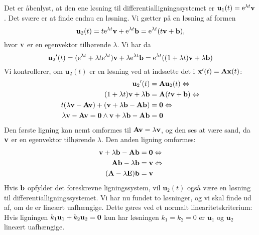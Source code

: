 \begin{bevis} \label{bev.diffsys.dobbeltrod1}
Det er åbenlyst, at den ene løsning til differentialligningssystemet er $ \mathbf u_1(t) = \mathrm{e}^{\lambda t} \mathbf{v} $. Det svære er at finde endnu en løsning. \bs
Vi gætter på en løsning af formen
\begin{equation}
\mathbf u_2(t) = t \mathrm{e}^{\lambda t} \mathbf{v} + \mathrm{e}^{\lambda t} \mathbf{b} = \mathrm{e}^{\lambda t}(t \mathbf{v} + \mathbf{b}),
\end{equation}
hvor $ \mathbf{v} $ er en egenvektor tilhørende $ \lambda $. Vi har da
\begin{equation}
\mathbf u_2\mathbf{'}(t) = (\mathrm{e}^{\lambda t} + \lambda t \mathrm{e}^{\lambda t})\mathbf{v} + \lambda \mathrm{e}^{\lambda t} \mathbf{b} = \mathrm{e}^{\lambda t}( (1 + \lambda t)\mathbf{v} + \lambda \mathbf{b})
\end{equation}
Vi kontrollerer, om $ \mathbf u_2(t) $ er en løsning ved at indsætte det i $ \mathbf{x}'(t) = \mathbf{A} \mathbf{x}(t) $:
\begin{equation}
\begin{aligned}
\mathbf u_2\mathbf{'}(t) &= \mathbf{A} \mathbf u_2(t) \Leftrightarrow \\
(1 + \lambda t)\mathbf{v} + \lambda \mathbf{b} &= \mathbf{A} (t \mathbf{v} + \mathbf{b}) \Leftrightarrow \\
t(\lambda \mathbf{v} - \mathbf{A} \mathbf{v} ) + (\mathbf{v} + \lambda \mathbf{b} - \mathbf{A} \mathbf{b}) &= \bm{0} \Leftrightarrow \\
\lambda \mathbf{v} - \mathbf{A} \mathbf{v} = \bm{0} \wedge \mathbf{v} + \lambda \mathbf{b} - \mathbf{A} \mathbf{b} &= \bm{0}
\end{aligned}
\end{equation}
Den første ligning kan nemt omformes til $ \mathbf{A} \mathbf{v} = \lambda \mathbf{v} $, og den ses at være sand, da $ \mathbf{v} $ er en egenvektor tilhørende $ \lambda $. Den anden ligning omformes:
\begin{equation}
\begin{aligned}
\mathbf{v} + \lambda \mathbf{b} - \mathbf{A} \mathbf{b} &= \bm{0} \Leftrightarrow \\
\mathbf{A} \mathbf{b} - \lambda \mathbf{b} &= \mathbf{v} \Leftrightarrow \\
(\mathbf{A} - \lambda \mathbf{E})\mathbf{b} &= \mathbf{v} 
\end{aligned}
\end{equation}
Hvis $ \mathbf{b} $ opfylder det foreskrevne ligningssystem, vil $ \mathbf u_2(t) $ også være en løsning til differentialligningssystemet. Vi har nu fundet to løsninger, og vi skal finde ud af, om de er lineært uafhængige. Dette gøres ved et normalt linearitetskriterium: Hvis ligningen $ k_1 \mathbf u_1 + k_2 \mathbf u_2 = \bm{0} $ kun har løsningen $ k_1=k_2=0 $ er $ \mathbf u_1 $ og $ \mathbf u_2 $ lineært uafhængige.
\begin{equation}

\end{equation}
\end{bevis}
